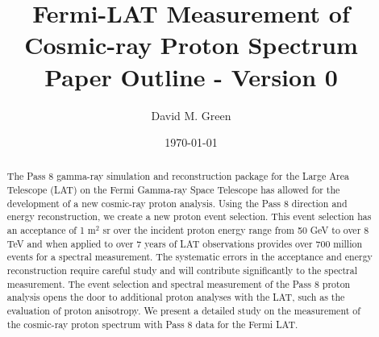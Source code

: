 \documentclass{article}
\begin{document}
 
\author{David M. Green}
\title{Fermi-LAT Measurement of Cosmic-ray Proton Spectrum \\ Paper Outline - Version 0}
\date{\today}

\maketitle

\begin{abstract}
The Pass 8 gamma-ray simulation and reconstruction package for the Large Area Telescope (LAT) on the Fermi Gamma-ray Space Telescope has allowed for the development of a new cosmic-ray proton analysis. 
Using the Pass 8 direction and energy reconstruction, we create a new proton event selection. 
This event selection has an acceptance of 1 m$^2$ sr over the incident proton energy range from 50 GeV to over 8 TeV and when applied to over 7 years of LAT observations provides over 700 million events for a spectral measurement. 
The systematic errors in the acceptance and energy reconstruction require careful study and will contribute significantly to the spectral measurement. 
The event selection and spectral measurement of the Pass 8 proton analysis opens the door to additional proton analyses with the LAT, such as the evaluation of proton anisotropy. 
We present a detailed study on the measurement of the cosmic-ray proton spectrum with Pass 8 data for the Fermi LAT.
\end{abstract}
\end{document}
